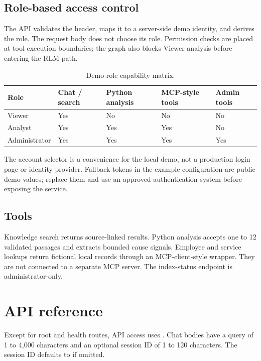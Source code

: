 \documentclass[11pt,a4paper,oneside]{report}
\newcommand{\code}[1]{\texttt{\detokenize{#1}}}
\begin{document}
\section{Role-based access control}
The API validates the \code{X-Demo-Token} header, maps it to a server-side demo identity, and derives the role. The request body does not choose its role. Permission checks are placed at tool execution boundaries; the graph also blocks Viewer analysis before entering the RLM path.

\begin{table}[H]
\centering
\begin{tabularx}{\textwidth}{@{}L{35mm}YYYY@{}}
\toprule
\textbf{Role} & \textbf{Chat / search} & \textbf{Python analysis} & \textbf{MCP-style tools} & \textbf{Admin tools} \\
\midrule
Viewer & Yes & No & No & No \\
Analyst & Yes & Yes & Yes & No \\
Administrator & Yes & Yes & Yes & Yes \\
\bottomrule
\end{tabularx}
\caption{Demo role capability matrix.}
\end{table}

The account selector is a convenience for the local demo, not a production login page or identity provider. Fallback tokens in the example configuration are public demo values; replace them and use an approved authentication system before exposing the service.

\section{Tools}
Knowledge search returns source-linked results. Python analysis accepts one to 12 validated passages and extracts bounded cause signals. Employee and service lookups return fictional local records through an MCP-client-style wrapper. They are not connected to a separate MCP server. The index-status endpoint is administrator-only.

\chapter{API reference}

Except for root and health routes, API access uses \code{X-Demo-Token}. Chat bodies have a query of 1 to 4,000 characters and an optional session ID of 1 to 120 characters. The session ID defaults to \code{demo} if omitted.
\end{document}
